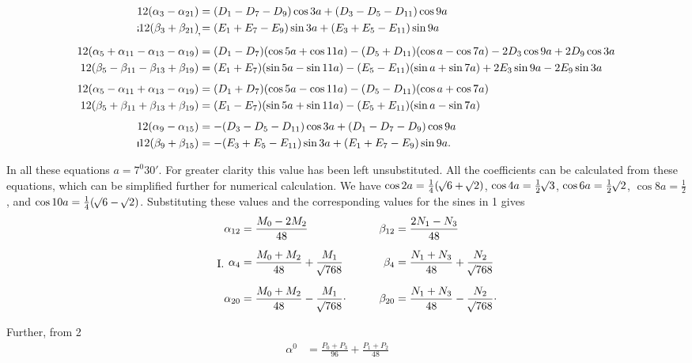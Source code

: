 \begin{landscape}
\[\begin{aligned}
12(\alpha_3-\alpha_{21})&=(D_1-D_7-D_9)\cos3a+(D_3-D_5-D_{11})\cos9a\\
\VthreeBrokenMark12(\beta_3+\beta_{21})\VthreeLowMark&=(E_1+E_7-E_9)\sin3a+(E_3+E_5-E_{11})\sin9a\\[4pt]
12(\alpha_5+\alpha_{11}-\alpha_{13}-\alpha_{19})&=(D_1-D_7)(\cos5a+\cos11a)-(D_5+D_{11})(\cos a-\cos7a)-2D_3\cos9a+2D_9\cos3a\\
12(\beta_5-\beta_{11}-\beta_{13}+\beta_{19})&=(E_1+E_7)(\sin5a-\sin11a)-(E_5-E_{11})(\sin a+\sin7a)+2E_3\sin9a-2E_9\sin3a\\[4pt]
12(\alpha_5-\alpha_{11}+\alpha_{13}-\alpha_{19})&=(D_1+D_7)(\cos5a-\cos11a)-(D_5-D_{11})(\cos a+\cos7a)\\
12(\beta_5+\beta_{11}+\beta_{13}+\beta_{19})&=(E_1-E_7)(\sin5a+\sin11a)-(E_5+E_{11})(\sin a-\sin7a)\\[4pt]
12(\alpha_9-\alpha_{15})&=-(D_3-D_5-D_{11})\cos3a+(D_1-D_7-D_9)\cos9a\\
\VthreeVerticalMark12(\beta_9+\beta_{15})&=-(E_3+E_5-E_{11})\sin3a+(E_1+E_7-E_9)\sin9a.
\end{aligned}
\]
\par\noindent\hspace*{\parindent}In all these equations \(a=7^0 30'\). For greater clarity this value has been left unsubstituted. All the coefficients can be calculated from these equations, which can be simplified further for numerical calculation. We have \(\cos2a=\tfrac14(\mathord{{}^{}\!\surd}6+\mathord{{}^{}\!\surd}2)\), \(\cos4a=\tfrac12\mathord{{}^{}\!\surd}3\), \(\cos6a=\tfrac12\mathord{{}^{}\!\surd}2\), \(\cos8a=\tfrac12\), and \(\cos10a=\tfrac14(\mathord{{}^{}\!\surd}6-\mathord{{}^{}\!\surd}2)\). Substituting these values and the corresponding values for the sines in 1 gives
\[
\tag*{I.}
\begin{aligned}
\alpha_{12}&=\frac{M_0-2M_2}{48}&\qquad\beta_{12}&=\frac{2N_1-N_3}{48}\\[6pt]
\alpha_4&=\frac{M_0+M_2}{48}+\frac{M_1}{\BareRoot{768}}&\beta_4&=\frac{N_1+N_3}{48}+\frac{N_2}{\BareRoot{768}}\\[6pt]
\alpha_{20}&=\frac{M_0+M_2}{48}-\frac{M_1}{\BareRoot{768}}\VthreeRaisedPoint&\beta_{20}&=\frac{N_1+N_3}{48}-\frac{N_2}{\BareRoot{768}}\VthreeRaisedPoint
\end{aligned}
\]
\clearpage{}
\par\noindent\hspace*{\parindent}Further, from 2
\[
\tag*{II.}
\begin{aligned}
\alpha^0&=\frac{P_0+P_3}{96}+\frac{P_1+P_2}{48}&&\\[6pt]

\end{aligned}\]
\end{landscape}
